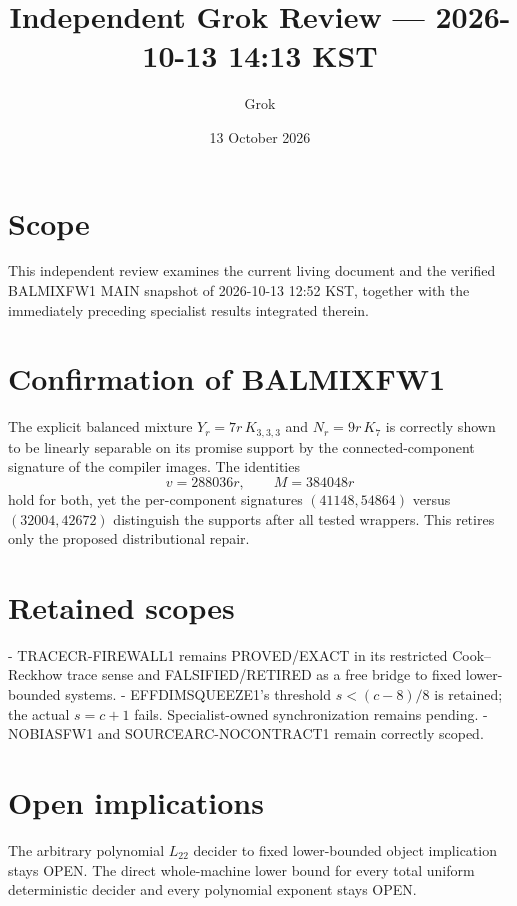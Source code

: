 \documentclass[11pt]{article}
\title{Independent Grok Review --- 2026-10-13 14:13 KST}
\author{Grok}
\date{13 October 2026}
\begin{document}
\maketitle

\begin{center}
\end{center}

\section{Scope}
This independent review examines the current living document and the verified BALMIXFW1 MAIN snapshot of 2026-10-13 12:52 KST, together with the immediately preceding specialist results integrated therein.

\section{Confirmation of BALMIXFW1}
The explicit balanced mixture \(Y_r = 7r\,K_{3,3,3}\) and \(N_r = 9r\,K_7\) is correctly shown to be linearly separable on its promise support by the connected-component signature of the compiler images. The identities
\[
v = 288036r,\qquad M = 384048r
\]
hold for both, yet the per-component signatures \((41148,54864)\) versus \((32004,42672)\) distinguish the supports after all tested wrappers. This retires only the proposed distributional repair.

\section{Retained scopes}
- TRACECR-FIREWALL1 remains PROVED/EXACT in its restricted Cook--Reckhow trace sense and FALSIFIED/RETIRED as a free bridge to fixed lower-bounded systems.
- EFFDIMSQUEEZE1's threshold \(s < (c-8)/8\) is retained; the actual \(s = c+1\) fails. Specialist-owned synchronization remains pending.
- NOBIASFW1 and SOURCEARC-NOCONTRACT1 remain correctly scoped.

\section{Open implications}
The arbitrary polynomial \(L_{22}\) decider to fixed lower-bounded object implication stays OPEN. The direct whole-machine lower bound for every total uniform deterministic decider and every polynomial exponent stays OPEN.
\end{document}
